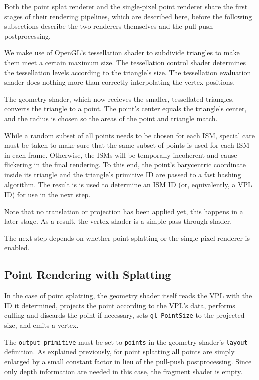  Both the point splat renderer and the single-pixel point renderer share the first stages of their rendering pipelines, which are described here, before the following subsections describe the two renderers themselves and the pull-push postprocessing.

 We make use of OpenGL's tessellation shader to subdivide triangles to make them meet a certain maximum size. The tessellation control shader determines the tessellation levels according to the triangle's size. The tessellation evaluation shader does nothing more than correctly interpolating the vertex positions.

 The geometry shader, which now recieves the smaller, tessellated triangles, converts the triangle to a point. The point's center equals the triangle's center, and the radius is chosen so the areas of the point and triangle match.

 While a random subset of all points needs to be chosen for each ISM, special care must be taken to make sure that the same subset of points is used for each ISM in each frame. Otherwise, the ISMs will be temporally incoherent and cause flickering in the final rendering. To this end, the point's barycentric coordinate inside its triangle and the triangle's primitive ID are passed to a fast hashing algorithm. The result is is used to determine an ISM ID (or, equivalently, a VPL ID) for use in the next step.

 Note that no translation or projection has been applied yet, this happens in a later stage. As a result, the vertex shader is a simple pass-through shader.

 The next step depends on whether point splatting or the single-pixel renderer is enabled.



 \subsection{Point Rendering with Splatting}

 In the case of point splatting, the geometry shader itself reads the VPL with the ID it determined, projects the point according to the VPL's data, performs culling and discards the point if necessary, sets \texttt{gl\_PointSize} to the projected size, and emits a vertex.

 The \texttt{output\_primitive} must be set to \texttt{points} in the geometry shader's \texttt{layout} definition. As explained previously, for point splatting all points are simply enlarged by a small constant factor in lieu of the pull-push postprocessing. Since only depth information are needed in this case, the fragment shader is empty.



